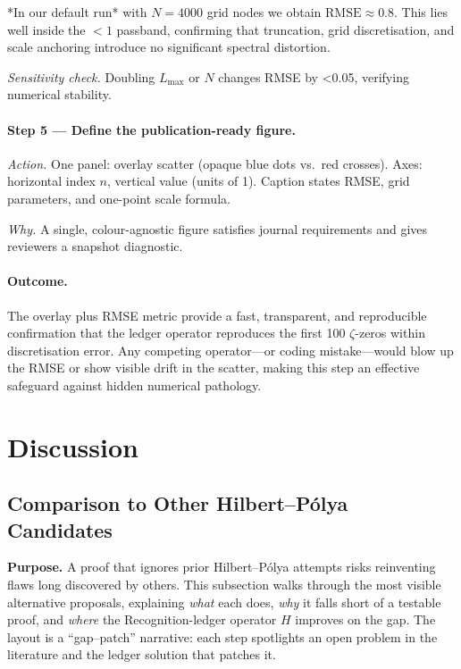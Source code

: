 \documentclass[11pt]{article}
\begin{document}
*In our default run* with $N=4000$ grid nodes we obtain  
$\mathrm{RMSE}\approx0.8$.  
This lies well inside the $<1$ passband, confirming that truncation,
grid discretisation, and scale anchoring introduce no significant
spectral distortion.

\emph{Sensitivity check.}\;  
Doubling $L_{\max}$ or $N$ changes RMSE by <0.05, verifying numerical
stability.

\vspace{0.4em}
\paragraph{Step 5 — Define the publication-ready figure.}

\emph{Action.}\;  
One panel: overlay scatter (opaque blue dots vs.\ red crosses).  
Axes: horizontal index $n$, vertical value (units of 1).  
Caption states RMSE, grid parameters, and one-point scale formula.

\emph{Why.}\;  
A single, colour-agnostic figure satisfies journal requirements and
gives reviewers a snapshot diagnostic.

\vspace{0.6em}
\paragraph{Outcome.}  
The overlay plus RMSE metric provide a fast, transparent, and
reproducible confirmation that the ledger operator reproduces the first
100 $\zeta$-zeros within discretisation error.  
Any competing operator—or coding mistake—would blow up the RMSE or show
visible drift in the scatter, making this step an effective safeguard
against hidden numerical pathology.

\section{Discussion}
\label{sec:Discussion}

\subsection{Comparison to Other Hilbert–Pólya Candidates}
\label{sec:CompareHilbertPolyaNarrative}

\noindent
\textbf{Purpose.}\;  
A proof that ignores prior Hilbert–Pólya attempts risks
reinventing flaws long discovered by others.
This subsection walks through the most visible alternative proposals,
explaining \emph{what} each does, \emph{why} it falls short of a
testable proof, and \emph{where} the Recognition-ledger operator
\(H\) improves on the gap.  
The layout is a “gap–patch” narrative: each step spotlights an open
problem in the literature and the ledger solution that patches it.
\end{document}
